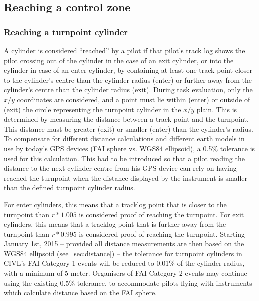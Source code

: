 \documentclass{article}
\begin{document}
\subsection{Reaching a control zone}
\subsubsection{Reaching a turnpoint cylinder}
\label{sec:reaching-a-turnpoint-cylinder}
A cylinder is considered “reached” by a pilot if that pilot’s track log shows
the pilot crossing out of the cylinder in the case of an exit cylinder, or into
the cylinder in case of an enter cylinder, by containing at least one track
point closer to the cylinder’s centre than the cylinder radius (enter) or
further away from the cylinder’s centre than the cylinder radius (exit). During
task evaluation, only the \(x/y\) coordinates are considered, and a point must
lie within (enter) or outside of (exit) the circle representing the turnpoint
cylinder in the \(x/y\) plain. This is determined by measuring the distance
between a track point and the turnpoint. This distance must be greater (exit)
or smaller (enter) than the cylinder’s radius.  To compensate for different
distance calculations and different earth models in use by today’s GPS devices
(FAI sphere vs. WGS84 ellipsoid), a 0.5\% tolerance is used for this
calculation. This had to be introduced so that a pilot reading the distance to
the next cylinder centre from his GPS device can rely on having reached the
turnpoint when the distance displayed by the instrument is smaller than the
defined turnpoint cylinder radius.

For enter cylinders, this means that a tracklog point that is closer to the
turnpoint than \(r*1.005\) is considered proof of reaching the turnpoint. For
exit cylinders, this means that a tracklog point that is further away from the
turnpoint than \(r*0.995\) is considered proof of reaching the turnpoint.
Starting January 1st, 2015 – provided all distance measurements are then based
on the WGS84 ellipsoid (see~\ref{sec:distance}) – the tolerance for turnpoint
cylinders in CIVL’s FAI Category 1 events will be reduced to 0.01\% of the
cylinder radius, with a minimum of 5 meter. Organisers of FAI Category 2 events
may continue using the existing 0.5\% tolerance, to accommodate pilots flying
with instruments which calculate distance based on the FAI sphere.
\end{document}
